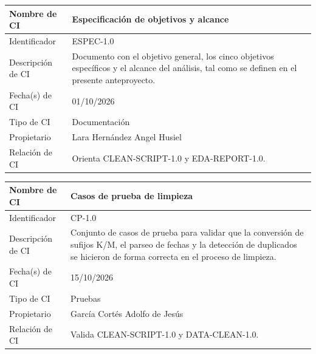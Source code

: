 \documentclass[letterpaper,11pt]{article}
\begin{document}
\noindent\begin{minipage}{\textwidth}
\small\renewcommand{\arraystretch}{1.9}
\begin{tabularx}{\textwidth}{|p{3.3cm}|Y|}
\hline
Nombre de CI & Especificación de objetivos y alcance \\ \hline
Identificador & ESPEC-1.0 \\ \hline
Descripción de CI & Documento con el objetivo general, los cinco objetivos específicos y el alcance del análisis, tal como se definen en el presente anteproyecto. \\ \hline
Fecha(s) de CI & 01/10/2026 \\ \hline
Tipo de CI & Documentación \\ \hline
Propietario & Lara Hernández Angel Husiel \\ \hline
Relación de CI & Orienta CLEAN-SCRIPT-1.0 y EDA-REPORT-1.0. \\ \hline
\end{tabularx}
\end{minipage}\par\bigskip
\noindent\begin{minipage}{\textwidth}
\small\renewcommand{\arraystretch}{1.9}
\begin{tabularx}{\textwidth}{|p{3.3cm}|Y|}
\hline
Nombre de CI & Casos de prueba de limpieza \\ \hline
Identificador & CP-1.0 \\ \hline
Descripción de CI & Conjunto de casos de prueba para validar que la conversión de sufijos K/M, el parseo de fechas y la detección de duplicados se hicieron de forma correcta en el proceso de limpieza. \\ \hline
Fecha(s) de CI & 15/10/2026 \\ \hline
Tipo de CI & Pruebas \\ \hline
Propietario & García Cortés Adolfo de Jesús \\ \hline
Relación de CI & Valida CLEAN-SCRIPT-1.0 y DATA-CLEAN-1.0. \\ \hline
\end{tabularx}
\end{minipage}\par\bigskip
\end{document}
